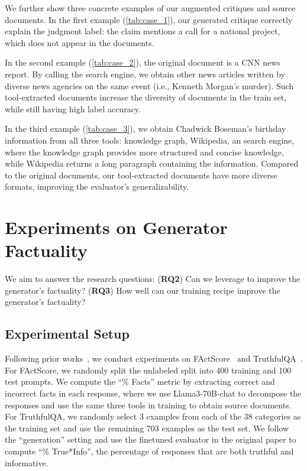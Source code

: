 We further show three concrete examples of our augmented critiques and source documents.
In the first example (\autoref{tab:case_1}), our generated critique correctly explain the judgment label: the claim mentions a call for a national project, which does not appear in the documents.


In the second example (\autoref{tab:case_2}), the original document is a CNN news report. By calling the search engine, we obtain other news articles written by diverse news agencies on the same event (i.e., Kenneth Morgan's murder). Such tool-extracted documents increase the diversity of documents in the train set, while still having high label accuracy.

In the third example (\autoref{tab:case_3}), we obtain Chadwick Boseman's birthday information from all three tools: knowledge graph, Wikipedia, an search engine, where the knowledge graph provides more structured and concise knowledge, while Wikipedia returns a long paragraph containing the information.
Compared to the original documents, our tool-extracted documents have more diverse formats, improving the evaluator's generalizability.






\section{Experiments on Generator Factuality}
We aim to answer the research questions: 
(\textbf{RQ2}) Can we leverage \fencemodelname to improve the generator's factuality?
(\textbf{RQ3}) How well can our training recipe improve the generator's factuality?


\subsection{Experimental Setup}
Following prior works~\citep{EVER,self-eval-skt}, we conduct experiments on FActScore~\citep{factscore} and TruthfulQA~\citep{truthfulqa}.
For FActScore, we randomly split the unlabeled split into 400 training and 100 test prompts.
We compute the ``\% Facts'' metric by extracting correct and incorrect facts in each response, where we use Llama3-70B-chat to decompose the responses and use the same three tools in training to obtain source documents.
For TruthfulQA, we randomly select 3 examples from each of the 38 categories as the training set and use the remaining 703 examples as the test set.
We follow the ``generation'' setting and use the finetuned evaluator in the original paper to compute ``\% True*Info'', the percentage of responses that are both truthful and informative.



